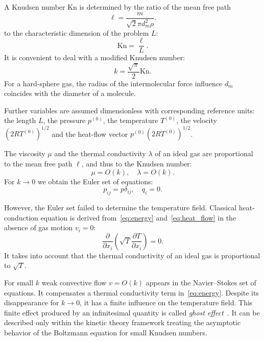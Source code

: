 \documentclass[smallextended, referee]{svjour3} %
\newcommand{\Kn}{\mathrm{Kn}}
\newcommand{\pder}[2][]{\frac{\partial#1}{\partial#2}}
\begin{document}
A Knudsen number \(\Kn\) is determined by the ratio of the mean free path
\begin{equation}\label{eq:ell}
	\ell = \frac{m}{\sqrt2\pi d_m^2 \rho}.
\end{equation}
to the characteristic dimension of the problem \(L\):
\begin{equation}\label{eq:Knudsen}
	\Kn = \frac{\ell}L.
\end{equation}
It is convenient to deal with a modified Knudsen number:
\begin{equation}
	k = \frac{\sqrt\pi}2\Kn.
\end{equation}
For a hard-sphere gas, the radius of the intermolecular force influence \(d_m\)
coincides with the diameter of a molecule.

Further variables are assumed dimensionless with corresponding reference units:
the length \(L\), the pressure \(p^{(0)}\), the temperature \(T^{(0)}\),
the velocity \((2RT^{(0)})^{1/2}\) and the heat-flow vector \(p^{(0)}(2RT^{(0)})^{1/2}\).

The viscosity \(\mu\) and the thermal conductivity \(\lambda\) of an ideal gas
are proportional to the mean free path \(\ell\), and thus to the Knudsen number:
\begin{equation}
	\mu = O(k), \quad \lambda = O(k).
\end{equation}
For \(k\to0\) we obtain the Euler set of equations:
\begin{equation}
	p_{ij} = p\delta_{ij}, \quad q_i = 0.
\end{equation}

However, the Euler set failed to determine the temperature field.
Classical heat-conduction equation is derived from~\eqref{eq:energy} and~\eqref{eq:heat_flow}
in the absence of gas motion \(v_i = 0\):
\begin{equation}\label{eq:heat_equation}
	\pder{x_i}\left(\sqrt{T}\pder[T]{x_i}\right) = 0.
\end{equation}
It takes into account that the thermal conductivity of an ideal gas is proportional to \(\sqrt{T}\).

For small \(k\) weak convective flow \(v = O(k)\) appears in the Navier--Stokes set of equations.
It compensates a thermal conductivity term in~\eqref{eq:energy}.
Despite its disappearance for \(k\to0\), it has a finite influence on the temperature field.
This finite effect produced by an infinitesimal quantity is called \textit{ghost effect}~\cite{Sone2002}.
It can be described only within the kinetic theory framework treating the asymptotic behavior of
the Boltzmann equation for small Knudsen numbers.
\end{document}
